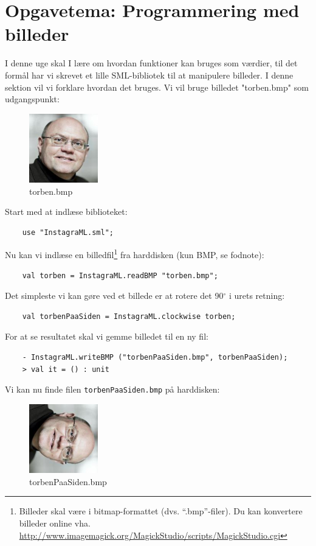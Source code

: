 \documentclass[a4paper,12pt]{article}
\begin{document}
\section{Opgavetema: Programmering med billeder}
I denne uge skal I lære om hvordan funktioner kan bruges som værdier,
til det formål har vi skrevet et lille SML-bibliotek til at manipulere
billeder. I denne sektion vil vi forklare hvordan det bruges. Vi vil
bruge billedet "torben.bmp" som udgangspunkt:
\begin{figure}[h!]
  \centering
  \includegraphics[width=3cm]{uge3_torben.png}

  \caption{torben.bmp}
\label{fig:torben}
\end{figure}

Start med at indlæse biblioteket:
\begin{lstlisting}
    use "InstagraML.sml";
\end{lstlisting}

Nu kan vi indlæse en billedfil\footnote{Billeder skal være i bitmap-formattet
  (dvs. "`.bmp"'-filer). Du kan konvertere billeder online vha.
  \url{http://www.imagemagick.org/MagickStudio/scripts/MagickStudio.cgi}}
fra harddisken (kun BMP, se fodnote):
\begin{lstlisting}
    val torben = InstagraML.readBMP "torben.bmp";
\end{lstlisting}

Det simpleste vi kan gøre ved et billede er at rotere det
90$^\circ$ i urets retning:
\begin{lstlisting}
    val torbenPaaSiden = InstagraML.clockwise torben;
\end{lstlisting}
For at se resultatet skal vi gemme billedet til en ny fil:
\begin{lstlisting}
    - InstagraML.writeBMP ("torbenPaaSiden.bmp", torbenPaaSiden);
    > val it = () : unit
\end{lstlisting}
Vi kan nu finde filen \verb|torbenPaaSiden.bmp| på harddisken:

\begin{figure}[h!]
  \centering
  \includegraphics[width=3cm]{uge3_torbenPaaSiden.png}

  \caption{torbenPaaSiden.bmp}
\label{fig:torbenPaaSiden}
\end{figure}
\end{document}
